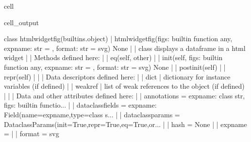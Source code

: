 \documentclass[letterpaper,10pt,english]{jupyterBook}
\begin{document}
\begin{sphinxuseclass}{cell}
\begin{sphinxVerbatimOutput}
\begin{sphinxuseclass}{cell_output}
\begin{sphinxVerbatim}[commandchars=\\\{\}]
    class htmlwidget\PYGZus{}fig(builtins.object)
     |  htmlwidget\PYGZus{}fig(figs: \PYGZlt{}built\PYGZhy{}in function any\PYGZgt{}, expname: str = \PYGZsq{}\PYGZsq{}, format: str = \PYGZsq{}svg\PYGZsq{}) \PYGZhy{}\PYGZgt{} None
     |  
     |  class displays a dataframe in a html widget
     |  
     |  Methods defined here:
     |  
     |  \PYGZus{}\PYGZus{}eq\PYGZus{}\PYGZus{}(self, other)
     |  
     |  \PYGZus{}\PYGZus{}init\PYGZus{}\PYGZus{}(self, figs: \PYGZlt{}built\PYGZhy{}in function any\PYGZgt{}, expname: str = \PYGZsq{}\PYGZsq{}, format: str = \PYGZsq{}svg\PYGZsq{}) \PYGZhy{}\PYGZgt{} None
     |  
     |  \PYGZus{}\PYGZus{}post\PYGZus{}init\PYGZus{}\PYGZus{}(self)
     |  
     |  \PYGZus{}\PYGZus{}repr\PYGZus{}\PYGZus{}(self)
     |  
     |  \PYGZhy{}\PYGZhy{}\PYGZhy{}\PYGZhy{}\PYGZhy{}\PYGZhy{}\PYGZhy{}\PYGZhy{}\PYGZhy{}\PYGZhy{}\PYGZhy{}\PYGZhy{}\PYGZhy{}\PYGZhy{}\PYGZhy{}\PYGZhy{}\PYGZhy{}\PYGZhy{}\PYGZhy{}\PYGZhy{}\PYGZhy{}\PYGZhy{}\PYGZhy{}\PYGZhy{}\PYGZhy{}\PYGZhy{}\PYGZhy{}\PYGZhy{}\PYGZhy{}\PYGZhy{}\PYGZhy{}\PYGZhy{}\PYGZhy{}\PYGZhy{}\PYGZhy{}\PYGZhy{}\PYGZhy{}\PYGZhy{}\PYGZhy{}\PYGZhy{}\PYGZhy{}\PYGZhy{}\PYGZhy{}\PYGZhy{}\PYGZhy{}\PYGZhy{}\PYGZhy{}\PYGZhy{}\PYGZhy{}\PYGZhy{}\PYGZhy{}\PYGZhy{}\PYGZhy{}\PYGZhy{}\PYGZhy{}\PYGZhy{}\PYGZhy{}\PYGZhy{}\PYGZhy{}\PYGZhy{}\PYGZhy{}\PYGZhy{}\PYGZhy{}\PYGZhy{}\PYGZhy{}\PYGZhy{}\PYGZhy{}\PYGZhy{}\PYGZhy{}\PYGZhy{}
     |  Data descriptors defined here:
     |  
     |  \PYGZus{}\PYGZus{}dict\PYGZus{}\PYGZus{}
     |      dictionary for instance variables (if defined)
     |  
     |  \PYGZus{}\PYGZus{}weakref\PYGZus{}\PYGZus{}
     |      list of weak references to the object (if defined)
     |  
     |  \PYGZhy{}\PYGZhy{}\PYGZhy{}\PYGZhy{}\PYGZhy{}\PYGZhy{}\PYGZhy{}\PYGZhy{}\PYGZhy{}\PYGZhy{}\PYGZhy{}\PYGZhy{}\PYGZhy{}\PYGZhy{}\PYGZhy{}\PYGZhy{}\PYGZhy{}\PYGZhy{}\PYGZhy{}\PYGZhy{}\PYGZhy{}\PYGZhy{}\PYGZhy{}\PYGZhy{}\PYGZhy{}\PYGZhy{}\PYGZhy{}\PYGZhy{}\PYGZhy{}\PYGZhy{}\PYGZhy{}\PYGZhy{}\PYGZhy{}\PYGZhy{}\PYGZhy{}\PYGZhy{}\PYGZhy{}\PYGZhy{}\PYGZhy{}\PYGZhy{}\PYGZhy{}\PYGZhy{}\PYGZhy{}\PYGZhy{}\PYGZhy{}\PYGZhy{}\PYGZhy{}\PYGZhy{}\PYGZhy{}\PYGZhy{}\PYGZhy{}\PYGZhy{}\PYGZhy{}\PYGZhy{}\PYGZhy{}\PYGZhy{}\PYGZhy{}\PYGZhy{}\PYGZhy{}\PYGZhy{}\PYGZhy{}\PYGZhy{}\PYGZhy{}\PYGZhy{}\PYGZhy{}\PYGZhy{}\PYGZhy{}\PYGZhy{}\PYGZhy{}\PYGZhy{}
     |  Data and other attributes defined here:
     |  
     |  \PYGZus{}\PYGZus{}annotations\PYGZus{}\PYGZus{} = \PYGZob{}\PYGZsq{}expname\PYGZsq{}: \PYGZlt{}class \PYGZsq{}str\PYGZsq{}\PYGZgt{}, \PYGZsq{}figs\PYGZsq{}: \PYGZlt{}built\PYGZhy{}in functio...
     |  
     |  \PYGZus{}\PYGZus{}dataclass\PYGZus{}fields\PYGZus{}\PYGZus{} = \PYGZob{}\PYGZsq{}expname\PYGZsq{}: Field(name=\PYGZsq{}expname\PYGZsq{},type=\PYGZlt{}class \PYGZsq{}s...
     |  
     |  \PYGZus{}\PYGZus{}dataclass\PYGZus{}params\PYGZus{}\PYGZus{} = \PYGZus{}DataclassParams(init=True,repr=True,eq=True,or...
     |  
     |  \PYGZus{}\PYGZus{}hash\PYGZus{}\PYGZus{} = None
     |  
     |  expname = \PYGZsq{}\PYGZsq{}
     |  
     |  format = \PYGZsq{}svg\PYGZsq{}
    

\end{sphinxVerbatim}
\end{sphinxuseclass}
\end{sphinxVerbatimOutput}
\end{sphinxuseclass}
\end{document}
